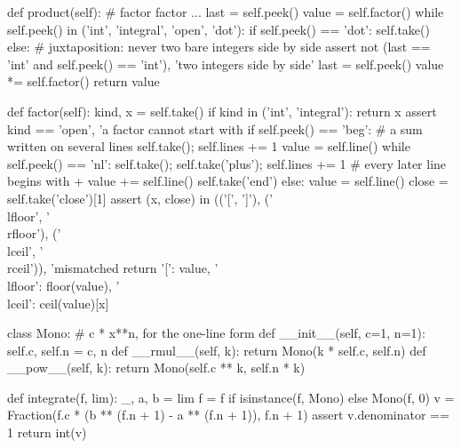     def product(self):                                # factor factor ...
        last = self.peek()
        value = self.factor()
        while self.peek() in ('int', 'integral', 'open', 'dot'):
            if self.peek() == 'dot':
                self.take()
            else:                                     # juxtaposition: never two bare integers side by side
                assert not (last == 'int' and self.peek() == 'int'), 'two integers side by side'
            last = self.peek()
            value *= self.factor()
        return value

    def factor(self):
        kind, x = self.take()
        if kind in ('int', 'integral'):
            return x
        assert kind == 'open', 'a factor cannot start with %
        if self.peek() == 'beg':                      # a sum written on several lines
            self.take(); self.lines += 1
            value = self.line()
            while self.peek() == 'nl':
                self.take(); self.take('plus'); self.lines += 1      # every later line begins with +
                value += self.line()
            self.take('end')
        else:
            value = self.line()
        close = self.take('close')[1]
        assert (x, close) in (('[', ']'), ('\\lfloor', '\\rfloor'), ('\\lceil', '\\rceil')), 'mismatched %
        return {'[': value, '\\lfloor': floor(value), '\\lceil': ceil(value)}[x]


class Mono:                                           # c * x**n, for the one-line form
    def __init__(self, c=1, n=1): self.c, self.n = c, n
    def __rmul__(self, k): return Mono(k * self.c, self.n)
    def __pow__(self, k): return Mono(self.c ** k, self.n * k)


def integrate(f, lim):
    _, a, b = lim
    f = f if isinstance(f, Mono) else Mono(f, 0)
    v = Fraction(f.c * (b ** (f.n + 1) - a ** (f.n + 1)), f.n + 1)
    assert v.denominator == 1
    return int(v)


